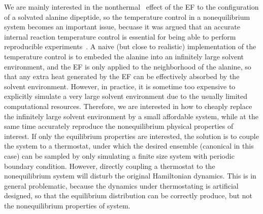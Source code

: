 \documentclass[a4paper,preprint,unsortedaddress,onecolumn]{revtex4-1}
\begin{document}

We are mainly interested in the
nonthermal~\cite{delaHoz2005microwaves} effect of the EF
to the configuration of a solvated alanine dipeptide,
so the temperature control in a nonequilibrium system
becomes an important issue, becuase it was argued that  an
accurate internal reaction temperature control is essential for being able to
perform reproducible experiments~\cite{damm2012can}.
A naive (but close to realistic) implementation of the temperature control is to 
embeded the alanine into an infinitely large solvent environment, and 
the EF is only applied to the neighborhood of the alanine, so that
any extra heat generated by the EF can be effectively
absorbed by the solvent environment.
However, in practice, it is sometime too expensive to explicitly
simulate a very large solvent environment
due to the usually limited computational resources.
Therefore, we are interested in how to cheaply replace the infinitely large
solvent environment by a small affordable system, while
at the same time accurately reproduce the nonequilibrium
physical properties of interest.
If only the equilibrium properties are interested, the solution is to couple
the system to a thermostat, under which the desired ensemble
(canonical in this case) can be
sampled by only simulating a finite size system with periodic boundary
condition.
However, directly coupling a thermostat to the nonequilibrium system
will disturb the original Hamiltonian dynamics. This is
in general problematic, 
because the dynamics  under thermostating is artificial designed,
so that the equilibrium distribution can be correctly produce, but not
the nonequilibrium properties of system.
\end{document}
